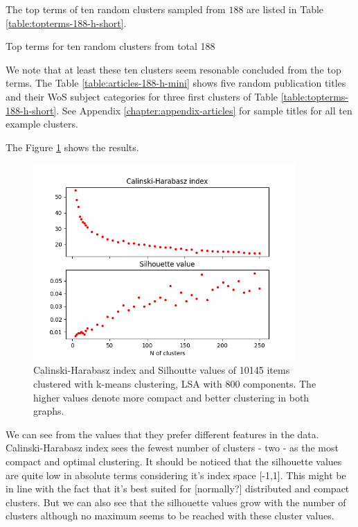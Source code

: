 The top terms of ten random clusters sampled from $188$ are listed
in Table \ref{table:topterms-188-h-short}.
\begin{table}[ht]
  \begin{center}
    
    \caption{Top terms for ten random clusters from total 188}
    \label{table:topterms-188-h-short}    
 \end{center}
\end{table}
We note that at least these ten clusters seem resonable concluded
from the top terms. The Table \ref{table:articles-188-h-mini} 
shows five random publication titles and their WoS subject 
categories for three first clusters of Table \ref{table:topterms-188-h-short}. 
See Appendix \ref{chapter:appendix-articles} for sample titles for
all ten example clusters.
\newpage



The Figure \ref{fig:ch-silh-full-h} shows the results.
\begin{figure}[ht]
  \begin{center}    
\includegraphics[width=10cm]{images/c-h-silh-index-plot-y2000-2_260-800-kmeans.png}
    \caption{Calinski-Harabasz index and Silhoutte values of 
10145 items clustered with k-means clustering, LSA with 800 
components. The higher values denote more compact and better 
clustering in both graphs.}
    \label{fig:ch-silh-full-h}
  \end{center}
\end{figure}

We can see from the values that they prefer different features in
the data. Calinski-Harabasz index sees the fewest number of 
clusters - two - as the most compact and optimal clustering. 
It should be noticed that the silhouette values are quite low 
in absolute terms considering it's index space [-1,1]. This might 
be in line with the fact that it's best suited for [normally?] 
distributed and compact clusters. But we can also see that the 
silhouette values grow with the number of clusters although no
maximum seems to be reached with these cluster values.


